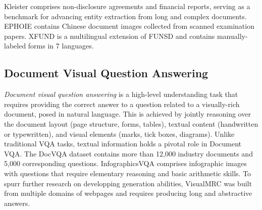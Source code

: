 Kleister \citep{gralinski2020kleister} comprises non-disclosure agreements and financial reports, serving as a benchmark for advancing entity extraction from long and complex documents. EPHOIE \citep{wang2021towards} contains Chinese document images collected from scanned examination papers. XFUND is a multilingual extension of \ac{FUNSD} \citep{xu-etal-2022-xfund} and contains manually-labeled forms in 7 languages.




\subsection{Document Visual Question Answering}


\textit{Document visual question answering} is a high-level understanding task that requires providing the correct answer to a question related to a visually-rich document, posed in natural language. This is achieved by jointly reasoning over the document layout (page structure, forms, tables), textual content (handwritten or typewritten), and visual elements (marks, tick boxes, diagrams). Unlike traditional \ac{VQA} tasks, textual information holds a pivotal role in \ac{Document VQA}. The DocVQA dataset \citep{mathew2021docvqa} contains more than 12,000 industry documents and 5,000 corresponding questions. InfographicsVQA \citep{mathew2022infographicvqa} comprises infographic images with questions that require elementary reasoning and basic arithmetic skills. To spurr further research on developping generation abilities, VisualMRC \citep{tanaka2021visualmrc} was built from multiple domains of webpages and requires producing long and abstractive answers. \\

